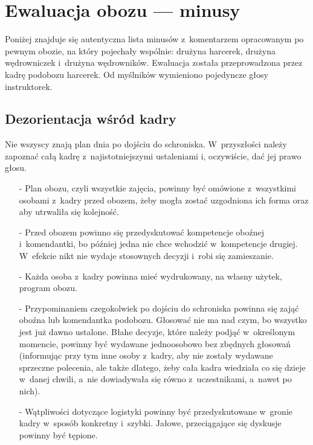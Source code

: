 \section{Ewaluacja obozu --- minusy\label{ewaluacja-minusy}}
Poniżej znajduje się autentyczna lista minusów z~komentarzem opracowanym po pewnym obozie, na który pojechały wspólnie: drużyna harcerek, drużyna wędrowniczek i~drużyna wędrowników. Ewaluacja została przeprowadzona przez kadrę podobozu harcerek. Od myślników wymieniono pojedyncze głosy instruktorek.
\subsection{Dezorientacja wśród kadry}
Nie wszyscy znają plan dnia po dojściu do schroniska. W~przyszłości należy zapoznać całą kadrę z~najistotniejszymi ustaleniami i, oczywiście, dać jej prawo głosu.
\begin{itemize}
\item[-] Plan obozu, czyli wszystkie zajęcia, powinny być omówione z~wszystkimi osobami z~kadry przed obozem, żeby mogła zostać uzgodniona ich forma oraz aby utrwaliła się kolejność.
\item[-] Przed obozem powinno się przedyskutować kompetencje oboźnej i~komendantki, bo później jedna nie chce wchodzić w~kompetencje drugiej. W~efekcie nikt nie wydaje stosownych decyzji i~robi się zamieszanie.
\item[-] Każda osoba z~kadry powinna mieć wydrukowany, na własny użytek, program obozu.
\item[-] Przypominaniem czegokolwiek po dojściu do schroniska powinna się zająć oboźna lub komendantka podobozu. Głosować nie ma nad czym, bo wszystko jest już dawno ustalone. Błahe decyzje, które należy podjąć w~określonym momencie, powinny być wydawane jednoosobowo bez zbędnych głosowań (informując przy tym inne osoby z~kadry, aby nie zostały wydawane sprzeczne polecenia, ale także dlatego, żeby cała kadra wiedziała co się dzieje w~danej chwili, a~nie dowiadywała się równo z~uczestnikami, a~nawet po nich).
\item[-] Wątpliwości dotyczące logistyki powinny być przedyskutowane w~gronie kadry w~sposób konkretny i~szybki. Jałowe, przeciągające się dyskusje powinny być tępione.
\end{itemize}
